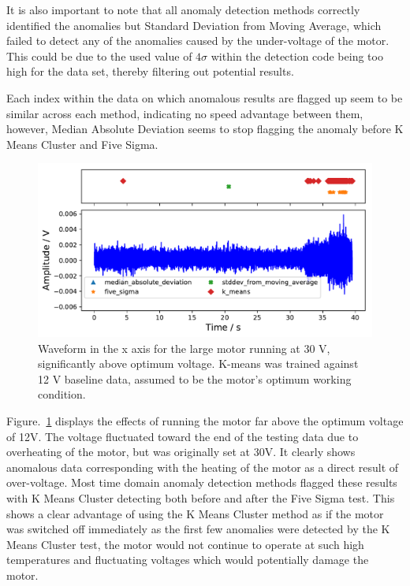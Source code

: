 It is also important to note that all anomaly detection methods correctly identified the anomalies but Standard Deviation from Moving Average, which failed to detect any of the anomalies caused by the under-voltage of the motor. This could be due to the used value of $4\sigma$ within the detection code being too high for the data set, thereby filtering out potential results.

Each index within the data on which anomalous results are flagged up seem to be similar across each method, indicating no speed advantage between them, however, Median Absolute Deviation seems to stop flagging the anomaly before K Means Cluster and Five Sigma. %

\begin{figure}[t]
    \includegraphics[width=1.0\textwidth]{fig/large_30V_large_12V.pdf}
    \caption[Overvoltage of Large Motor]{Waveform in the x axis for the large motor running at 30 V, significantly above optimum voltage. K-means was trained against 12 V baseline data, assumed to be the motor's optimum working condition.}
    \label{fig:largemotor_30V}
\end{figure}

Figure.~\ref{fig:largemotor_30V} displays the effects of running the motor far above the optimum voltage of 12V. The voltage fluctuated toward the end of the testing data due to overheating of the motor, but was originally set at 30V. It clearly shows anomalous data corresponding with the heating of the motor as a direct result of over-voltage. Most time domain anomaly detection methods flagged these results with K Means Cluster detecting both before and after the Five Sigma test. This shows a clear advantage of using the K Means Cluster method as if the motor was switched off immediately as the first few anomalies were detected by the K Means Cluster test, the motor would not continue to operate at such high temperatures and fluctuating voltages which would potentially damage the motor.

